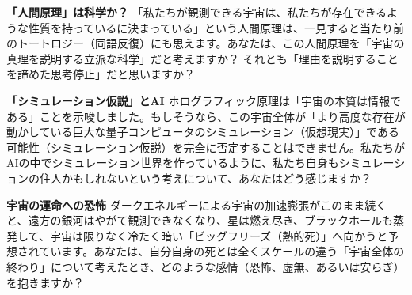 \textbf{「人間原理」は科学か？} 「私たちが観測できる宇宙は、私たちが存在できるような性質を持っているに決まっている」という人間原理は、一見すると当たり前のトートロジー（同語反復）にも思えます。あなたは、この人間原理を「宇宙の真理を説明する立派な科学」だと考えますか？ それとも「理由を説明することを諦めた思考停止」だと思いますか？

\textbf{「シミュレーション仮説」とAI} ホログラフィック原理は「宇宙の本質は情報である」ことを示唆しました。もしそうなら、この宇宙全体が「より高度な存在が動かしている巨大な量子コンピュータのシミュレーション（仮想現実）」である可能性（シミュレーション仮説）を完全に否定することはできません。私たちがAIの中でシミュレーション世界を作っているように、私たち自身もシミュレーションの住人かもしれないという考えについて、あなたはどう感じますか？

\textbf{宇宙の運命への恐怖} ダークエネルギーによる宇宙の加速膨張がこのまま続くと、遠方の銀河はやがて観測できなくなり、星は燃え尽き、ブラックホールも蒸発して、宇宙は限りなく冷たく暗い「ビッグフリーズ（熱的死）」へ向かうと予想されています。あなたは、自分自身の死とは全くスケールの違う「宇宙全体の終わり」について考えたとき、どのような感情（恐怖、虚無、あるいは安らぎ）を抱きますか？




